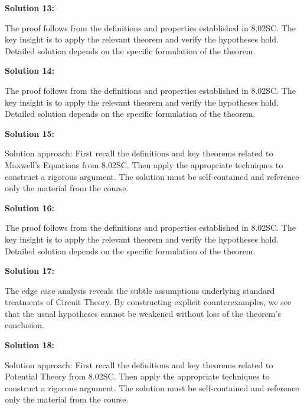 \documentclass[12pt,a4paper]{exam}
\begin{document}
\vspace{0.5cm}

\textbf{Solution 13:}

The proof follows from the definitions and properties established in 8.02SC. The key insight is to apply the relevant theorem and verify the hypotheses hold. Detailed solution depends on the specific formulation of the theorem.

\vspace{0.5cm}

\textbf{Solution 14:}

The proof follows from the definitions and properties established in 8.02SC. The key insight is to apply the relevant theorem and verify the hypotheses hold. Detailed solution depends on the specific formulation of the theorem.

\vspace{0.5cm}

\textbf{Solution 15:}

Solution approach: First recall the definitions and key theorems related to Maxwell's Equations from 8.02SC. Then apply the appropriate techniques to construct a rigorous argument. The solution must be self-contained and reference only the material from the course.

\vspace{0.5cm}

\textbf{Solution 16:}

The proof follows from the definitions and properties established in 8.02SC. The key insight is to apply the relevant theorem and verify the hypotheses hold. Detailed solution depends on the specific formulation of the theorem.

\vspace{0.5cm}

\textbf{Solution 17:}

The edge case analysis reveals the subtle assumptions underlying standard treatments of Circuit Theory. By constructing explicit counterexamples, we see that the usual hypotheses cannot be weakened without loss of the theorem's conclusion.

\vspace{0.5cm}

\textbf{Solution 18:}

Solution approach: First recall the definitions and key theorems related to Potential Theory from 8.02SC. Then apply the appropriate techniques to construct a rigorous argument. The solution must be self-contained and reference only the material from the course.
\end{document}
